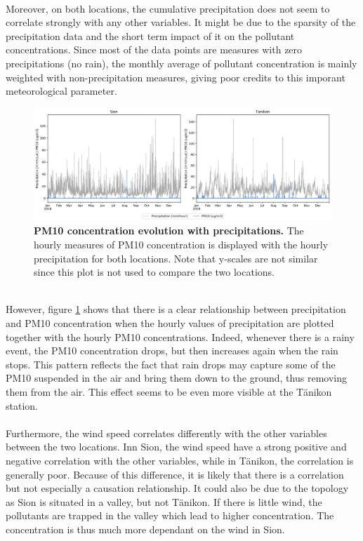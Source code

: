 \documentclass[a4paper, 12pt]{article}
\begin{document}
    \\
    Moreover, on both locations, the cumulative precipitation does not seem to correlate strongly with any other variables. It might be due to the sparsity of the precipitation data and the short term impact of it on the pollutant concentrations. Since most of the data points are measures with zero precipitations (no rain), the monthly average of pollutant concentration is mainly weighted with non-precipitation measures, giving poor credits to this imporant meteorological parameter. 
    \\
    \begin{figure}[t]
        \centering
        \includegraphics[width = 1 \textwidth]{Figures/Prec_vs_PM10.png}
        \caption{\textbf{PM10 concentration evolution with precipitations.} The hourly measures of PM10 concentration is displayed with the hourly precipitation for both locations. Note that y-scales are not similar since this plot is not used to compare the two locations.}
        \label{PrecvsPM10}
    \end{figure}
    \\
    However, figure \ref{PrecvsPM10} shows that there is a clear relationship between precipitation and PM10 concentration when the hourly values of precipitation are plotted together with the hourly PM10 concentrations. Indeed, whenever there is a rainy event, the PM10 concentration drops, but then increases again when the rain stops. This pattern reflects the fact that rain drops may capture some of the PM10 suspended in the air and bring them down to the ground, thus removing them from the air. This effect seems to be even more visible at the Tänikon station. 
    \\
    \\
    Furthermore, the wind speed correlates differently with the other variables between the two locations. Inn Sion, the wind speed have a strong positive and negative correlation with the other variables, while in Tänikon, the correlation is generally poor. Because of this difference, it is likely that there is a correlation but not especially a causation relationship. It could also be due to the topology as Sion is situated in a valley, but not Tänikon. If there is little wind, the pollutants are trapped in the valley which lead to higher concentration. The concentration is thus much more dependant on the wind in Sion. 
\end{document}
